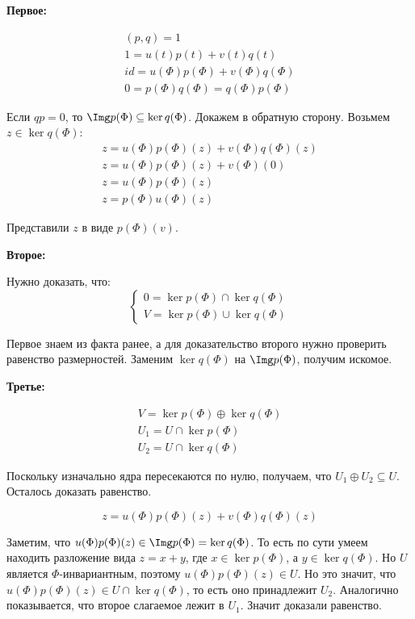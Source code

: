 \textbf{Первое:}

\begin{gather*}
    (p, q) = 1
    \\
    1 = u(t) p(t) + v(t) q(t)
    \\
    id = u(\Phi) p(\Phi) + v(\Phi) q(\Phi)
    \\
    0 = p(\Phi) q(\Phi) = q(\Phi) p(\Phi)
\end{gather*}

Если \( qp = 0 \), то \( \Img p(\Phi) \subseteq \ker q(\Phi) \).
Докажем в обратную сторону.
Возьмем \( z \in \ker q(\Phi) \):
\begin{gather*}
    z = u(\Phi) p(\Phi) (z) + v(\Phi) q(\Phi) (z)
    \\
    z = u(\Phi) p(\Phi) (z) + v(\Phi) (0)
    \\
    z = u(\Phi) p(\Phi) (z)
    \\
    z = p(\Phi) u(\Phi) (z)
\end{gather*}

Представили \( z \) в виде \( p(\Phi) (v) \).

\textbf{Второе:}

Нужно доказать, что:
\[
    \begin{cases}
        0 = \ker p(\Phi) \cap \ker q(\Phi)
        \\
        V = \ker p(\Phi) \cup \ker q(\Phi)
    \end{cases}
\]

Первое знаем из факта ранее,
а для доказательство второго нужно проверить равенство размерностей.
Заменим \( \ker q(\Phi) \) на \( \Img p(\Phi) \), получим искомое.

\textbf{Третье:}

\begin{gather*}
    V = \ker p(\Phi) \oplus \ker q(\Phi)
    \\
    U_1 = U \cap \ker p(\Phi)
    \\
    U_2 = U \cap \ker q(\Phi)
\end{gather*}

Поскольку изначально ядра пересекаются по нулю,
получаем, что \( U_1 \oplus U_2 \subseteq U \).
Осталось доказать равенство.

\[
    z = u(\Phi) p(\Phi) (z) + v(\Phi) q(\Phi) (z)
\]

Заметим, что
\(
    u(\Phi) p(\Phi) (z) \in \Img p(\Phi) = \ker q(\Phi)
\).
То есть по сути умеем находить разложение вида \( z = x + y \), где \( x \in \ker p(\Phi) \), а \( y \in \ker q(\Phi) \).
Но \( U \) является \( \Phi \)-инвариантным, поэтому \( u(\Phi) p(\Phi) (z) \in U \).
Но это значит, что \( u(\Phi) p(\Phi) (z) \in U \cap \ker q(\Phi) \),
то есть оно принадлежит \( U_2 \).
Аналогично показывается, что второе слагаемое лежит в \( U_1 \).
Значит доказали равенство.

